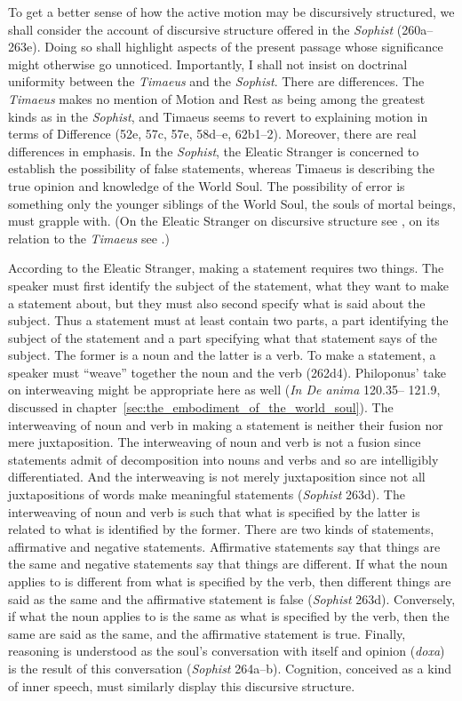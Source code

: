 To get a better sense of how the active motion may be discursively structured, we shall consider the account of discursive structure offered in the \emph{Sophist} (260a--263e). Doing so shall highlight aspects of the present passage whose significance might otherwise go unnoticed. Importantly, I shall not insist on doctrinal uniformity between the \emph{Timaeus} and the \emph{Sophist}. There are differences. The \emph{Timaeus} makes no mention of Motion and Rest as being among the greatest kinds as in the \emph{Sophist}, and Timaeus seems to revert to explaining motion in terms of Difference (52e, 57c, 57e, 58d--e, 62b1--2). Moreover, there are real differences in emphasis. In the \emph{Sophist}, the Eleatic Stranger is concerned to establish the possibility of false statements, whereas Timaeus is describing the true opinion and knowledge of the World Soul. The possibility of error is something only the younger siblings of the World Soul, the souls of mortal beings, must grapple with. (On the Eleatic Stranger on discursive structure see \citealt[]{Frede:1992ec}, on its relation to the \emph{Timaeus} see \citealt[]{Betegh:2019fq}.)

According to the Eleatic Stranger, making a statement requires two things. The speaker must first identify the subject of the statement, what they want to make a statement about, but they must also second specify what is said about the subject. Thus a statement must at least contain two parts, a part identifying the subject of the statement and a part specifying what that statement says of the subject. The former is a noun and the latter is a verb. To make a statement, a speaker must ``weave'' together the noun and the verb (262d4). Philoponus' take on interweaving might be appropriate here as well (\emph{In De anima} 120.35– 121.9, discussed in chapter~\ref{sec:the_embodiment_of_the_world_soul}). The interweaving of noun and verb in making a statement is neither their fusion nor mere juxtaposition. The interweaving of noun and verb is not a fusion since statements admit of decomposition into nouns and verbs and so are intelligibly differentiated. And the interweaving is not merely juxtaposition since not all juxtapositions of words make meaningful statements (\emph{Sophist} 263d). The interweaving of noun and verb is such that what is specified by the latter is related to what is identified by the former. There are two kinds of statements, affirmative and negative statements. Affirmative statements say that things are the same and negative statements say that things are different. If what the noun applies to is different from what is specified by the verb, then different things are said as the same and the affirmative statement is false (\emph{Sophist} 263d). Conversely, if what the noun applies to is the same as what is specified by the verb, then the same are said as the same, and the affirmative statement is true. Finally, reasoning is understood as the soul's conversation with itself and opinion (\emph{doxa}) is the result of this conversation (\emph{Sophist} 264a--b). Cognition, conceived as a kind of inner speech, must similarly display this discursive structure.

